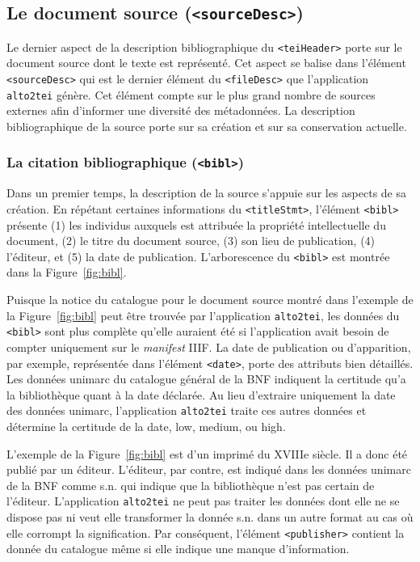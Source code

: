 \documentclass[class=article, crop=false]{standalone}
\begin{document}
\subsection{Le document source (\texttt{<sourceDesc>})}
Le dernier aspect de la description bibliographique du \texttt{<teiHeader>} porte sur le document source dont le texte est représenté. Cet aspect se balise dans l'élément \texttt{<sourceDesc>} qui est le dernier élément du \texttt{<fileDesc>} que l'application \texttt{alto2tei} génère. Cet élément compte sur le plus grand nombre de sources externes afin d'informer une diversité des métadonnées. La description bibliographique de la source porte sur sa création et sur sa conservation actuelle.

\subsubsection{La citation bibliographique (\texttt{<bibl>})}
Dans un premier temps, la description de la source s'appuie sur les aspects de sa création. En répétant certaines informations du \texttt{<titleStmt>}, l'élément  \texttt{<bibl>} présente (1) les individus auxquels est attribuée la propriété intellectuelle du document, (2) le titre du document source, (3) son lieu de publication, (4) l'éditeur, et (5) la date de publication. L'arborescence du \texttt{<bibl>} est montrée dans la Figure~\ref{fig:bibl}.

Puisque la notice du catalogue pour le document source montré dans l'exemple de la Figure~\ref{fig:bibl} peut être trouvée par l'application \texttt{alto2tei}, les données du \texttt{<bibl>} sont plus complète qu'elle auraient été si l'application avait besoin de compter uniquement sur le \textit{manifest} \acrshort{IIIF}. La date de publication ou d'apparition, par exemple, représentée dans l'élément \texttt{<date>}, porte des attributs bien détaillés. Les données \Gls{unimarc} du catalogue général de la \acrshort{BNF} indiquent la certitude qu'a la bibliothèque quant à la date déclarée. Au lieu d'extraire uniquement la date des données \Gls{unimarc}, l'application \texttt{alto2tei} traite ces autres données et détermine la certitude de la date, \og{}low\fg{}, \og{}medium\fg{}, ou \og{}high\fg{}.

L'exemple de la Figure~\ref{fig:bibl} est d'un imprimé du XVIIIe siècle. Il a donc été publié par un éditeur. L'éditeur, par contre, est indiqué dans les données \Gls{unimarc} de la \acrshort{BNF} comme \og{}s.n.\fg{} qui indique que la bibliothèque n'est pas certain de l'éditeur. L'application \texttt{alto2tei} ne peut pas traiter les données dont elle ne se dispose pas ni veut elle transformer la donnée \og{}s.n.\fg{} dans un autre format au cas où elle corrompt la signification. Par conséquent, l'élément \texttt{<publisher>} contient la donnée du catalogue même si elle indique une manque d'information.
\end{document}
